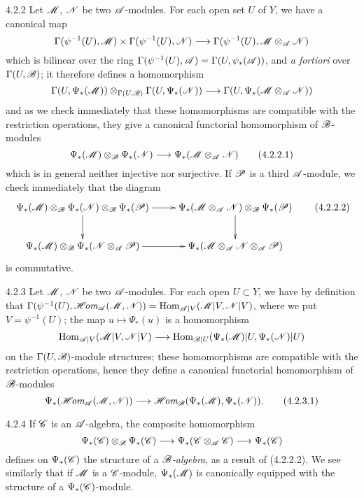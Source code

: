 \begin{env}{4.2.2}
\label{env-0.4.2.2}
Let $\mathscr{M}$, $\mathscr{N}$ be two $\mathscr{A}$-modules. For each open set $U$ of $Y$, we
have a canonical map
\[
  \Gamma(\psi^{-1}(U),\mathscr{M})\times\Gamma(\psi^{-1}(U),\mathscr{N})
  \longrightarrow\Gamma(\psi^{-1}(U),\mathscr{M}\otimes_\mathscr{A}\mathscr{N})
\]
which is bilinear over the ring
$\Gamma(\psi^{-1}(U),\mathscr{A})=\Gamma(U,\psi_*(\mathscr{A}))$, and \emph{a fortiori}
over $\Gamma(U,\mathscr{B})$; it therefore defines a homomorphism
\[
  \Gamma(U,\Psi_*(\mathscr{M}))\otimes_{\Gamma(U,\mathscr{B})}\Gamma(U,\Psi_*(\mathscr{N}))
  \longrightarrow\Gamma(U,\Psi_*(\mathscr{M}\otimes_\mathscr{A}\mathscr{N}))
\]
and as we check immediately that these homomorphisms are compatible with the
restriction operations, they give a canonical functorial homomorphism of
$\mathscr{B}$-modules
\[
  \Psi_*(\mathscr{M})\otimes_\mathscr{B}\Psi_*(\mathscr{N})
  \longrightarrow\Psi_*(\mathscr{M}\otimes_\mathscr{A}\mathscr{N})
  \tag{4.2.2.1}
\]
which is in general neither injective nor surjective. If $\mathscr{P}$ is a third
$\mathscr{A}$-module, we check immediately that the diagram
\[
  \xymatrix{
    \Psi_*(\sh{M})\otimes_\sh{B}\Psi_*(\sh{N})\otimes_\sh{B}\Psi_*(\sh{P})\ar[r]\ar[d]
    & \Psi_*(\sh{M}\otimes_\sh{A}\sh{N})\otimes_\sh{B}\Psi_*(\sh{P})\ar[d]\\
    \Psi_*(\sh{M})\otimes_\sh{B}\Psi_*(\sh{N}\otimes_\sh{A}\sh{P})\ar[r]
    & \Psi_*(\sh{M}\otimes_\sh{A}\sh{N}\otimes_\sh{A}\sh{P})
  }
  \tag{4.2.2.2}
\]
is commutative.
\end{env}

\begin{env}{4.2.3}
\label{env-0.4.2.3}
Let $\mathscr{M}$, $\mathscr{N}$ be two $\mathscr{A}$-modules. For each open $U\subset Y$, we
have by definition that
$\Gamma(\psi^{-1}(U),\mathscr{H}\!\textit{om}_\mathscr{A}(\mathscr{M},\mathscr{N}))
  ={\mathop{\mathrm{Hom}}\nolimits}_{\mathscr{A}|V}(\mathscr{M}|V,\mathscr{N}|V)$, where we put $V=\psi^{-1}(U)$; the map
$u\mapsto\Psi_*(u)$ is a homomorphism
\[
  {\mathop{\mathrm{Hom}}\nolimits}_{\mathscr{A}|V}(\mathscr{M}|V,\mathscr{N}|V)
  \longrightarrow{\mathop{\mathrm{Hom}}\nolimits}_{\mathscr{B}|U}(\Psi_*(\mathscr{M})|U,\Psi_*(\mathscr{N})|U)
\]
on the $\Gamma(U,\mathscr{B})$-module structures; these homomorphisms are compatible
with the restriction operations, hence they define a canonical functorial
homomorphism of $\mathscr{B}$-modules
\[
  \Psi_*(\mathscr{H}\!\textit{om}_\mathscr{A}(\mathscr{M},\mathscr{N}))
  \longrightarrow\mathscr{H}\!\textit{om}_\mathscr{B}(\Psi_*(\mathscr{M}),\Psi_*(\mathscr{N})).
  \tag{4.2.3.1}
\]
\end{env}

\begin{env}{4.2.4}
\label{env-0.4.2.4}
If $\mathscr{C}$ is an $\mathscr{A}$-algebra, the composite homomorphism
\[
  \Psi_*(\mathscr{C})\otimes_\mathscr{B}\Psi_*(\mathscr{C})
  \longrightarrow\Psi_*(\mathscr{C}\otimes_\mathscr{A}\mathscr{C})
  \longrightarrow\Psi_*(\mathscr{C})
\]
defines on $\Psi_*(\mathscr{C})$ the structure of a \emph{$\mathscr{B}$-algebra}, as a
result of (4.2.2.2). We see similarly that if $\mathscr{M}$ is a $\mathscr{C}$-module,
$\Psi_*(\mathscr{M})$ is canonically equipped with the structure of a
$\Psi_*(\mathscr{C})$-module.
\end{env}

